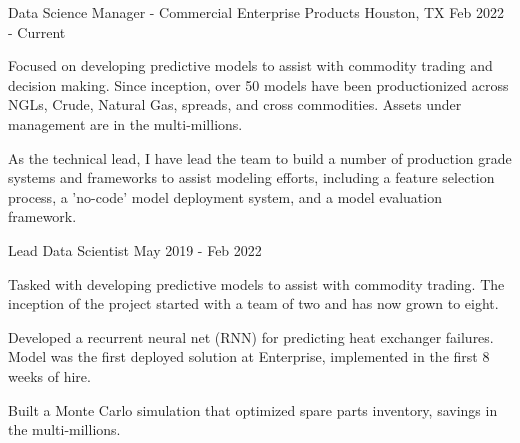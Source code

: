 
\begin{cventries}

\cventry
{Data Science Manager - Commercial} %
{Enterprise Products} %
{Houston, TX} %
{Feb 2022 - Current} %
{ %
\begin{cvitems}
\item {Focused on developing predictive models to assist with commodity trading and decision making. Since inception, over 50 models have been productionized across NGLs, Crude, Natural Gas, spreads, and cross commodities. Assets under management are in the multi-millions.}
\item {As the technical lead, I have lead the team to build a number of production grade systems and frameworks to assist modeling efforts, including a feature selection process, a 'no-code' model deployment system, and a model evaluation framework.}
\end{cvitems}
}

\cventry
{Lead Data Scientist} %
{} %
{} %
{May 2019 - Feb 2022} %
{ %
\begin{cvitems}
\item {Tasked with developing predictive models to assist with commodity trading. The inception of the project started with a team of two and has now grown to eight.}
\item {Developed a recurrent neural net (RNN) for predicting heat exchanger failures. Model was the first deployed solution at Enterprise, implemented in the first 8 weeks of hire.}
\item {Built a Monte Carlo simulation that optimized spare parts inventory, savings in the multi-millions.}
\end{cvitems}
}



\end{cventries}
